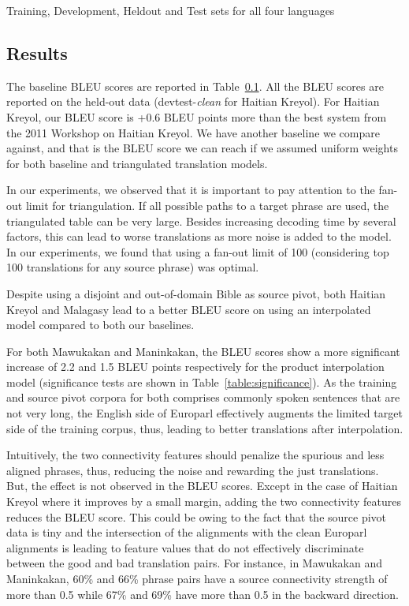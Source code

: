 \documentclass[11pt]{article}
\begin{document}
	\begin{table}
		\small
		\centering
		
		\caption{Training, Development, Heldout and Test sets for all four languages}
		\label{table:ddtt}
	\end{table}

\subsection{Results}
\label{sec:results}
	
	The baseline BLEU scores are reported in Table~\ref{sec:results}. All the BLEU scores are reported on the held-out data (devtest-\emph{clean} for Haitian Kreyol). For Haitian Kreyol, our BLEU score is +0.6 BLEU points more than the best system from the 2011 Workshop on Haitian Kreyol. We have another baseline we compare against, and that is the BLEU score we can reach if we assumed uniform weights for both baseline and triangulated translation models.  

	In our experiments, we observed that it is important to pay attention to the fan-out limit for triangulation. If all possible paths to a target phrase are used, the triangulated table can be very large. Besides increasing decoding time by several factors, this can lead to worse translations as more noise is added to the model. In our experiments, we found that using a fan-out limit of 100 (considering top 100 translations for any source phrase) was optimal. 

	Despite using a disjoint and out-of-domain Bible as source pivot, both Haitian Kreyol and Malagasy lead to a better BLEU score on using an interpolated model compared to both our baselines. 

	For both Mawukakan and Maninkakan, the BLEU scores show a more significant increase of 2.2 and 1.5 BLEU points respectively for the product interpolation model (significance tests are shown in Table~\ref{table:significance}). As the training and source pivot corpora for both comprises commonly spoken sentences that are not very long, the English side of Europarl effectively augments the limited target side of the training corpus, thus, leading to better translations after interpolation. 

	Intuitively, the two connectivity features should penalize the spurious and less aligned phrases, thus, reducing the noise and rewarding the just translations. But, the effect is not observed in the BLEU scores. Except in the case of Haitian Kreyol where it improves by a small margin, adding the two connectivity features reduces the BLEU score. This could be owing to the fact that the source pivot data is tiny and the intersection of the alignments with the clean Europarl alignments is leading to feature values that do not effectively discriminate between the good and bad translation pairs. For instance, in Mawukakan and Maninkakan, 60\% and 66\% phrase pairs have a source connectivity strength of more than 0.5 while 67\% and 69\% have more than 0.5 in the backward direction.
\end{document}

